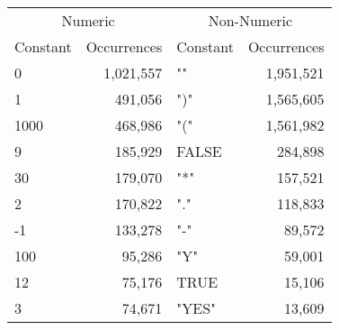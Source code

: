 \begin{tabular}{lr|lr}
\toprule
 \multicolumn{2}{c|}{Numeric}   &  \multicolumn{2}{|c}{Non-Numeric}   \\
 Constant & Occurrences &  Constant & Occurrences \\
\midrule
	0 &	1,021,557 & "" & 1,951,521 \\
	1 &	491,056 & ")" & 1,565,605 \\
	1000 & 468,986 & "(" & 1,561,982 \\
	9 &	185,929 & FALSE &	284,898 \\
	30 & 179,070 & "*" &	157,521 \\
	2 &	170,822 & "." & 118,833 \\
	-1 &	133,278 & "-" &	89,572 \\
	100	& 95,286 &	"Y" & 59,001 \\
	12 & 75,176 & TRUE &	15,106 \\
	3 &	74,671 & "YES"	& 13,609 \\
\bottomrule
\end{tabular}